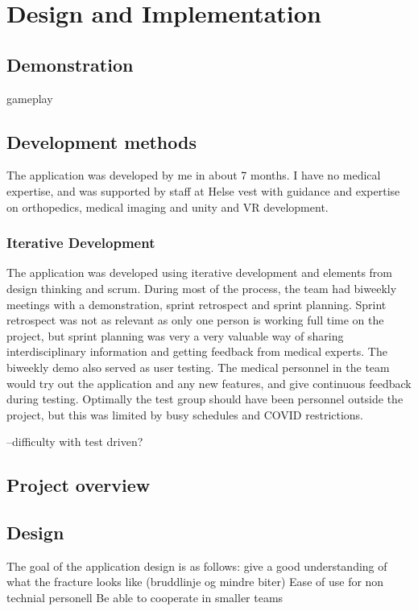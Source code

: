 \documentclass[a4paper]{report}
\begin{document}
\chapter{Design and Implementation}\label{Design and Implementation}

\section{Demonstration}\label{demonstration}
gameplay

\section{Development methods}


The application was developed by me in about 7 months. I have no medical expertise, and was supported by staff at Helse vest with guidance and expertise on orthopedics, medical imaging and unity and VR development.

\subsection{Iterative Development}
The application was developed using iterative development and elements from design thinking and scrum.
During most of the process, the team had biweekly meetings with a demonstration, sprint retrospect and sprint planning. Sprint retrospect was not as relevant as only one person is working full time on the project, but sprint planning was very a very valuable way of sharing interdisciplinary information and getting feedback from medical experts.
The biweekly demo also served as user testing. The medical personnel in the team would try out the application and any new features, and give continuous feedback during testing. Optimally the test group should have been personnel outside the project, but this was limited by busy schedules and COVID restrictions.

--difficulty with test driven?

\section{Project overview}\label{CodeStructure}

\section{Design}

The goal of the application design is as follows:
give a good understanding of what the fracture looks like (bruddlinje og mindre biter)
Ease of use for non technial personell
Be able to cooperate in smaller teams
\end{document}
